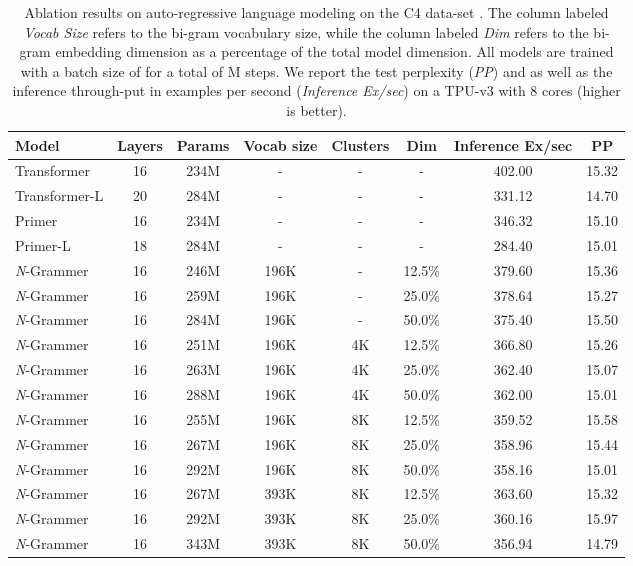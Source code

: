\documentclass[11pt]{article}
\begin{document}
\begin{table*}[ht]
\centering
\begin{tabular}{lccccccc}
\toprule
       Model &  Layers & Params & Vocab size & Clusters & Dim & Inference Ex/sec & PP \\
       \midrule
        Transformer & 16 & 234M & - & -  & - & 402.00 & 15.32 \\ 
        Transformer-L & 20 & 284M & - & - & - & 331.12 & 14.70 \\\midrule
        Primer & 16 & 234M & - & -  &- & 346.32 & 15.10 \\ 
        Primer-L & 18 & 284M & - & - & - & 284.40  & 15.01 \\ \midrule
        \textit{N}-Grammer & 16 & 246M & 196K & - & 12.5\% & 379.60 &  15.36 \\ 
        \textit{N}-Grammer & 16 & 259M & 196K & - & 25.0\% & 378.64 & 15.27 \\
        \textit{N}-Grammer & 16 & 284M & 196K & - & 50.0\% & 375.40 & 15.50 \\ \midrule
        \textit{N}-Grammer & 16 & 251M & 196K & 4K & 12.5\% & 366.80 & 15.26 \\
        \textit{N}-Grammer & 16 & 263M & 196K & 4K & 25.0\% & 362.40 &  15.07 \\ 
        \textit{N}-Grammer & 16 & 288M & 196K & 4K & 50.0\% & 362.00 & 15.01 \\  \midrule
        \textit{N}-Grammer & 16 & 255M & 196K & 8K & 12.5\% & 359.52 & 15.58 \\ 
        \textit{N}-Grammer & 16 & 267M & 196K & 8K & 25.0\% & 358.96 & 15.44 \\
        \textit{N}-Grammer & 16 & 292M & 196K & 8K & 50.0\% & 358.16 & 15.01 \\ \midrule
\textit{N}-Grammer & 16 & 267M & 393K & 8K & 12.5\% & 363.60 & 15.32 \\
        \textit{N}-Grammer & 16 & 292M & 393K & 8K & 25.0\% & 360.16 & 15.97 \\ 
        \textit{N}-Grammer & 16 & 343M & 393K & 8K & 50.0\% & 356.94 & 14.79 \\ 
    \bottomrule
    \end{tabular}
\vspace{1mm}
\caption{Ablation results on auto-regressive language modeling on the C4 
data-set \citep{raffel2019exploring}. 
The column labeled \textit{Vocab Size} refers to the bi-gram vocabulary size, 
while the column labeled \textit{Dim} refers to the 
bi-gram embedding dimension as a percentage of the total 
model dimension. All models are trained with a batch size 
of  for a total of M steps. We report the test
perplexity (\textit{PP}) and as well as the inference
through-put in examples per second 
(\textit{Inference Ex/sec}) on a 
TPU-v3 with 8 cores (higher is better).}
\label{tab:c4-ablation}
\end{table*}
\end{document}
